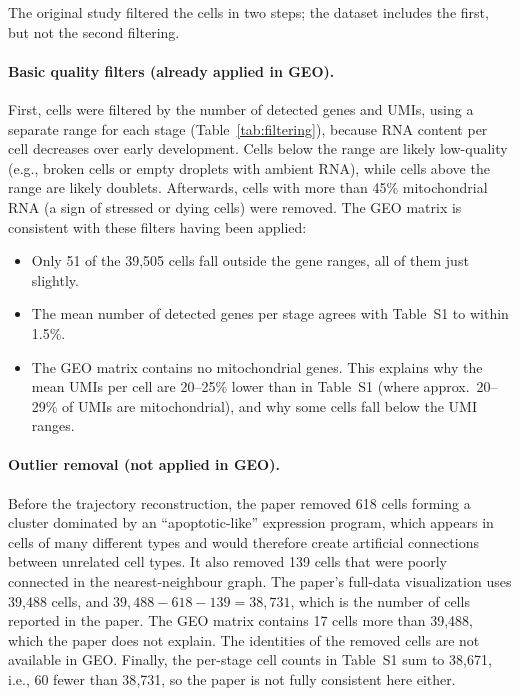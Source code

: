 \documentclass[11pt,a4paper]{article}
\begin{document}
The original study filtered the cells in two steps; the dataset includes the first, but not the second filtering.

\paragraph{Basic quality filters (already applied in GEO).} First, cells were filtered by the number of detected genes and UMIs, using a separate range for each stage (Table~\ref{tab:filtering}), because RNA content per cell decreases over early development. Cells below the range are likely low-quality (e.g., broken cells or empty droplets with ambient RNA), while cells above the range are likely doublets. Afterwards, cells with more than 45\% mitochondrial RNA (a sign of stressed or dying cells) were removed. The GEO matrix is consistent with these filters having been applied:
\begin{itemize}
	\item Only 51 of the 39{,}505 cells fall outside the gene ranges, all of them just slightly.
	\item The mean number of detected genes per stage agrees with Table~S1 to within 1.5\%.
	\item The GEO matrix contains no mitochondrial genes. This explains why the mean UMIs per cell are 20--25\% lower than in Table~S1 (where approx.~20--29\% of UMIs are mitochondrial), and why some cells fall below the UMI ranges.%
\end{itemize}

\paragraph{Outlier removal (not applied in GEO).} Before the trajectory reconstruction, the paper removed 618 cells forming a cluster dominated by an ``apoptotic-like'' expression program, which appears in cells of many different types and would therefore create artificial connections between unrelated cell types. It also removed 139 cells that were poorly connected in the nearest-neighbour graph. The paper's full-data visualization uses 39{,}488 cells, and $39{,}488 - 618 - 139 = 38{,}731$, which is the number of cells reported in the paper. The GEO matrix contains 17 cells more than 39{,}488, which the paper does not explain. The identities of the removed cells are not available in GEO. Finally, the per-stage cell counts in Table~S1 sum to 38{,}671, i.e., 60 fewer than 38{,}731, so the paper is not fully consistent here either.
\end{document}
